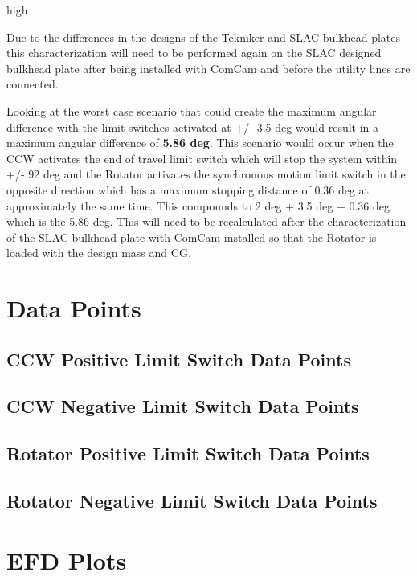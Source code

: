 high\documentclass[SE,lsstdraft,authoryear,toc]{lsstdoc}
\begin{document}
Due to the differences in the designs of the Tekniker and SLAC bulkhead
plates this characterization will need to be performed again on the SLAC
designed bulkhead plate after being installed with ComCam and before the
utility lines are connected.

Looking at the worst case scenario that could create the maximum angular
difference with the limit switches activated at +/- 3.5 deg would result
in a maximum angular difference of \textbf{5.86 deg}. This scenario
would occur when the CCW activates the end of travel limit switch which
will stop the system within +/- 92 deg and the Rotator activates the
synchronous motion limit switch in the opposite direction which has a
maximum stopping distance of 0.36 deg at approximately the same time.
This compounds to 2 deg + 3.5 deg + 0.36 deg which is the 5.86 deg. This
will need to be recalculated after the characterization of the SLAC
bulkhead plate with ComCam installed so that the Rotator is loaded with
the design mass and CG.

\appendix
\section{Data Points}
\subsection{CCW Positive Limit Switch Data Points}
\subsection{CCW Negative Limit Switch Data Points}
\subsection{Rotator Positive Limit Switch Data Points}
\subsection{Rotator Negative Limit Switch Data Points}

\section{EFD Plots}
\end{document}
